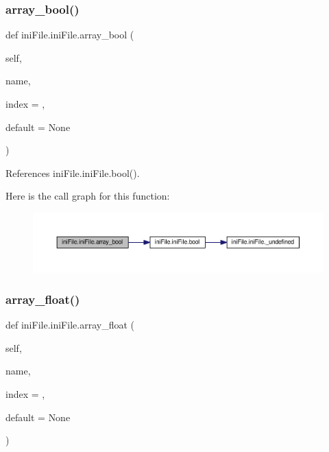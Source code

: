 \subsubsection{\texorpdfstring{array\+\_\+bool()}{array\_bool()}}
{\footnotesize\ttfamily def ini\+File.\+ini\+File.\+array\+\_\+bool (\begin{DoxyParamCaption}\item[{}]{self,  }\item[{}]{name,  }\item[{}]{index = {},  }\item[{}]{default = {\ttfamily None} }\end{DoxyParamCaption})}



References ini\+File.\+ini\+File.\+bool().

Here is the call graph for this function\+:
\nopagebreak
\begin{figure}[H]
\begin{center}
\leavevmode
\includegraphics[width=350pt]{classiniFile_1_1iniFile_abf1b3994c4b30f12a06b51562e30898f_cgraph}
\end{center}
\end{figure}
\mbox{\label{classiniFile_1_1iniFile_a6608bf642e15eb6992c3279c2902dc39}} 
\subsubsection{\texorpdfstring{array\+\_\+float()}{array\_float()}}
{\footnotesize\ttfamily def ini\+File.\+ini\+File.\+array\+\_\+float (\begin{DoxyParamCaption}\item[{}]{self,  }\item[{}]{name,  }\item[{}]{index = {},  }\item[{}]{default = {\ttfamily None} }\end{DoxyParamCaption})}



